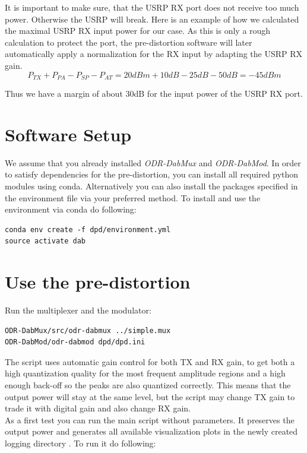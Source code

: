 \documentclass[paper=a4, fontsize=11pt]{scrartcl} %
\numberwithin{equation}{section} %
\numberwithin{figure}{section} %
\numberwithin{table}{section} %
\begin{document}
It is important to make sure, that the USRP RX port does not receive too much power. Otherwise the USRP will break. Here is an example of how we calculated the maximal USRP RX input power for our case. As this is only a rough calculation to protect the port, the pre-distortion software will later automatically apply a normalization for the RX input by adapting the USRP RX gain.
$$P_{TX} + P_{PA} - P_{SP} - P_{AT} = 20dBm + 10dB -25dB -50dB = -45dBm$$

Thus we have a margin of about 30dB for the input power of the USRP RX port.


\section{Software Setup}

We assume that you already installed \emph{ODR-DabMux} and \emph{ODR-DabMod}. In order to satisfy dependencies for the pre-distortion, you can install all required python modules using conda. Alternatively you can also install the packages specified in the environment file via your preferred method. To install and use the environment via conda do following:

\begin{lstlisting}
conda env create -f dpd/environment.yml
source activate dab
\end{lstlisting}


\section{Use the pre-distortion}

Run the multiplexer and the modulator:

\begin{lstlisting}
ODR-DabMux/src/odr-dabmux ../simple.mux
ODR-DabMod/odr-dabmod dpd/dpd.ini
\end{lstlisting}

The script uses automatic gain control for both TX and RX gain, to get both a high quantization quality for the most frequent amplitude regions and a high enough back-off so the peaks are also quantized correctly. This means that the output power will stay at the same level, but the script may change TX gain to trade it with digital gain and also change RX gain. \\

As a first test you can run the main script without parameters. It preserves the output power and generates all available visualization plots in the newly created logging directory . To run it do following:
\end{document}

